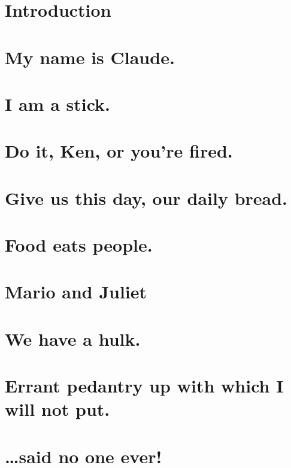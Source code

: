 

\chapter{Introduction} %

\chapter{My name is Claude.} %

\chapter{I am a stick.} %

\chapter{Do it, Ken, or you're fired.} %

\chapter{Give us this day, our daily bread.} %

\chapter{Food eats people.} %

\chapter{Mario and Juliet} %

\chapter{We have a hulk.} %

\chapter{Errant pedantry up with which I will not put.} %

\chapter{\ldots{}said no one ever!} %

